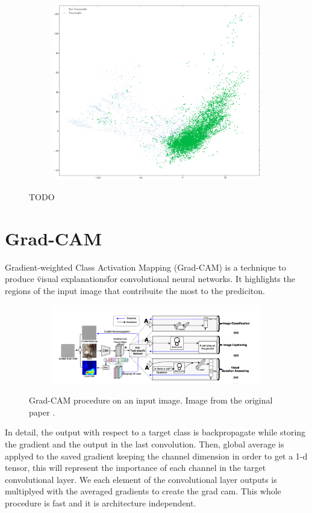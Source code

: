 \documentclass[../document.tex]{subfiles}
\begin{document}
\begin{figure}[H]
\begin{subfigure}[b]{0.48\textwidth}
        \includegraphics[width=\linewidth]{../img/5/pca/pca-test-1.png}
    \end{subfigure}
\caption{TODO}
\end{figure}
% 
% 

\section{Grad-CAM}
Gradient-weighted Class Activation Mapping (Grad-CAM) \cite{gradcam} is a technique to produce \"visual explanations\" for convolutional neural networks. It highlights the regions of the input image that contribuite the most to the prediciton. 
\begin{figure}[H]
    \centering
    \begin{subfigure}[b]{1\textwidth}
        \includegraphics[width=\linewidth]{../img/5/grad_cam1.png}
    \end{subfigure}
\caption{Grad-CAM procedure on an input image. Image from the original paper \cite{gradcam}.}
\end{figure}
In detail, the output with respect to a target class is backpropagate while storing the gradient and the output in the last convolution. Then, global average is applyed to the saved gradient keeping the channel dimension in order to get a 1-d tensor, this will represent the importance of each channel in the target convolutional layer. We  each element of the convolutional layer outputs is multiplyed with the averaged gradients to create the grad cam. This whole procedure is fast and it is architecture independent.
\end{document}
